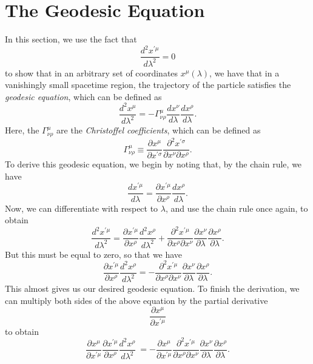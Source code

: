 \documentclass[12pt]{article}
\theoremstyle{definition}
\theoremstyle{remark}
\begin{document}

\section{The Geodesic Equation}

	In this section, we use the fact that 
		\[
		\frac{d^2 x^{ \prime \mu}}{d \lambda^2} = 0
		\]
	to show that in an arbitrary set of coordinates $x^{\mu}(\lambda)$, we have that in a vanishingly small spacetime region, the trajectory of the particle satisfies the \textit{geodesic equation}, which can be defined as
		\[
		\frac{ d^2 x^{ \mu } }{d \lambda^2 } = 
		- \Gamma^{ \mu }_{ \nu \rho } 
		\frac{d x^{\nu} }{ d \lambda } 
		\frac{ d x^{ \rho } }{d \lambda} . 
		\]
	Here, the $\Gamma^{\mu}_{\nu \rho}$ are the \textit{Christoffel coefficients}, which can be defined as 
		\[
		\Gamma_{ \nu \rho }^{ \mu } \equiv 
		\frac{ \partial x^{ \mu } }{ \partial x^{ \prime \sigma } }
		\frac{ \partial^2 x^{ \prime \sigma } }{ \partial x^{ \nu } \partial x^{ \rho } }.
		\]
	To derive this geodesic equation, we begin by noting that, by the chain rule, we have
		\[
		\frac{ d x^{ \prime \mu } }{ d \lambda } = 
		\frac{  \partial x^{ \prime \mu} }{ \partial x^{ \rho } } 
		\frac{ d x^{ \rho } }{ d \lambda }.
		\]
	Now, we can differentiate with respect to $\lambda$, and use the chain rule once again, to obtain 
		\[
		\frac{ d^2 x^{ \prime \mu } }{ d \lambda^2 } = 
		\frac{ \partial x^{ \prime \mu } }{ \partial x^{ \rho } } 
		\frac{ d^2 x^{ \rho } }{ d \lambda^2 }
		+ 
		\frac{ \partial^2 x^{ \prime \mu } }{\partial x^{ \rho } \partial x^{ \nu } }
		\frac{ \partial x^{ \nu } }{ \partial \lambda }
		\frac{ \partial x^{ \rho } }{\partial \lambda } .
		\]
	But this must be equal to zero, so that we have 
		\[
		\frac{ \partial x^{ \prime \mu } }{ \partial x^{ \rho } } 
		\frac{ d^2 x^{ \rho } }{ d \lambda^2 } 
		=
		-
		\frac{ \partial^2 x^{ \prime \mu } }{\partial x^{ \rho } \partial x^{ \nu } }
		\frac{ \partial x^{ \nu } }{ \partial \lambda }
		\frac{ \partial x^{ \rho } }{\partial \lambda }.
		\]
	This almost gives us our desired geodesic equation.  To finish the derivation, we can multiply both sides of the above equation by the partial derivative
		\[
		\frac{ \partial x^{ \mu } }{ \partial x^{ \prime \mu } }
		\]
	to obtain
		\[
		\frac{ \partial x^{ \mu } }{ \partial x^{ \prime \mu } }
		\frac{ \partial x^{ \prime \mu } }{ \partial x^{ \rho } } 
		\frac{ d^2 x^{ \rho } }{ d \lambda^2 } \
		=
		-
		\frac{ \partial x^{ \mu } }{ \partial x^{ \prime \mu } }
		\frac{ \partial^2 x^{ \prime \mu } }{\partial x^{ \rho } \partial x^{ \nu } }
		\frac{ \partial x^{ \nu } }{ \partial \lambda }
		\frac{ \partial x^{ \rho } }{\partial \lambda }.
		\]
\end{document}
